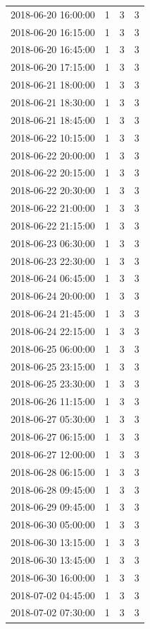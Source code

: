 \begin{tabular}{lrrr}
2018-06-20 16:00:00 & 1 & 3 & 3 \\
2018-06-20 16:15:00 & 1 & 3 & 3 \\
2018-06-20 16:45:00 & 1 & 3 & 3 \\
2018-06-20 17:15:00 & 1 & 3 & 3 \\
2018-06-21 18:00:00 & 1 & 3 & 3 \\
2018-06-21 18:30:00 & 1 & 3 & 3 \\
2018-06-21 18:45:00 & 1 & 3 & 3 \\
2018-06-22 10:15:00 & 1 & 3 & 3 \\
2018-06-22 20:00:00 & 1 & 3 & 3 \\
2018-06-22 20:15:00 & 1 & 3 & 3 \\
2018-06-22 20:30:00 & 1 & 3 & 3 \\
2018-06-22 21:00:00 & 1 & 3 & 3 \\
2018-06-22 21:15:00 & 1 & 3 & 3 \\
2018-06-23 06:30:00 & 1 & 3 & 3 \\
2018-06-23 22:30:00 & 1 & 3 & 3 \\
2018-06-24 06:45:00 & 1 & 3 & 3 \\
2018-06-24 20:00:00 & 1 & 3 & 3 \\
2018-06-24 21:45:00 & 1 & 3 & 3 \\
2018-06-24 22:15:00 & 1 & 3 & 3 \\
2018-06-25 06:00:00 & 1 & 3 & 3 \\
2018-06-25 23:15:00 & 1 & 3 & 3 \\
2018-06-25 23:30:00 & 1 & 3 & 3 \\
2018-06-26 11:15:00 & 1 & 3 & 3 \\
2018-06-27 05:30:00 & 1 & 3 & 3 \\
2018-06-27 06:15:00 & 1 & 3 & 3 \\
2018-06-27 12:00:00 & 1 & 3 & 3 \\
2018-06-28 06:15:00 & 1 & 3 & 3 \\
2018-06-28 09:45:00 & 1 & 3 & 3 \\
2018-06-29 09:45:00 & 1 & 3 & 3 \\
2018-06-30 05:00:00 & 1 & 3 & 3 \\
2018-06-30 13:15:00 & 1 & 3 & 3 \\
2018-06-30 13:45:00 & 1 & 3 & 3 \\
2018-06-30 16:00:00 & 1 & 3 & 3 \\
2018-07-02 04:45:00 & 1 & 3 & 3 \\
2018-07-02 07:30:00 & 1 & 3 & 3 \\

\end{tabular}
